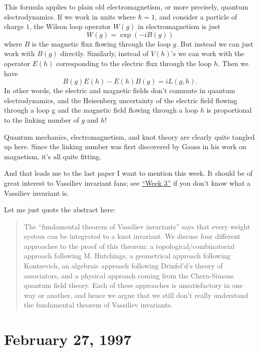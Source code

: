 \documentclass{article}
\def\tightlist{}
\renewcommand{\texttt}[1]{%
  \begingroup
  \ttfamily
  \begingroup\lccode`~=`/\lowercase{\endgroup\def~}{/\discretionary{}{}{}}%
  \begingroup\lccode`~=`[\lowercase{\endgroup\def~}{[\discretionary{}{}{}}%
  \begingroup\lccode`~=`.\lowercase{\endgroup\def~}{.\discretionary{}{}{}}%
  \catcode`/=\active\catcode`[=\active\catcode`.=\active
  \scantokens{#1\noexpand}%
  \endgroup
}
\begin{document}
This formula applies to plain old electromagnetism, or more precisely,
quantum electrodynamics. If we work in units where \(\hbar = 1\), and
consider a particle of charge \(1\), the Wilson loop operator \(W(g)\)
in electromagnetism is just \[W(g) = \exp(-iB(g))\] where \(B\) is the
magnetic flux flowing through the loop \(g\). But instead we can just
work with \(B(g)\) directly. Similarly, instead of \(V(h)\)'s we can
work with the operator \(E(h)\) corresponding to the electric flux
through the loop \(h\). Then we have
\[B(g) E(h) - E(h) B(g) = i L(g,h).\] In other words, the electric and
magnetic fields don't commute in quantum electrodynamics, and the
Heisenberg uncertainty of the electric field flowing through a loop g
and the magnetic field flowing through a loop \(h\) is proportional to
the linking number of \(g\) and \(h\)!

Quantum mechanics, electromagnetism, and knot theory are clearly quite
tangled up here. Since the linking number was first discovered by Gauss
in his work on magnetism, it's all quite fitting.

And that leads me to the last paper I want to mention this week. It
should be of great interest to Vassiliev invariant fans; see
\protect\hyperlink{week3}{``Week 3''} if you don't know what a Vassiliev
invariant is.


Let me just quote the abstract here:

\begin{quote}
The ``fundamental theorem of Vassiliev invariants'' says that every
weight system can be integrated to a knot invariant. We discuss four
different approaches to the proof of this theorem: a
topological/combinatorial approach following M. Hutchings, a geometrical
approach following Kontsevich, an algebraic approach following
Drinfel'd's theory of associators, and a physical approach coming from
the Chern-Simons quantum field theory. Each of these approaches is
unsatisfactory in one way or another, and hence we argue that we still
don't really understand the fundamental theorem of Vassiliev invariants.
\end{quote}
\hypertarget{week98}{%
\section{February 27, 1997}\label{week98}}
\end{document}
